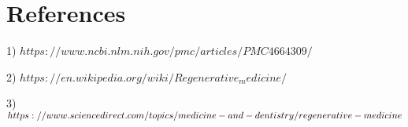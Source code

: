 \documentclass[12pt]{article}
\begin{document}
\centering \section*{\Huge References }
\Large
\raggedright  
1) $ https://www.ncbi.nlm.nih.gov/pmc/articles/PMC4664309/ $

\vspace{5mm}

2) $ https://en.wikipedia.org/wiki/Regenerative_medicine/  $ 

\vspace{5mm}

3) $ https://www.sciencedirect.com/topics/medicine-and-dentistry/  
\vspace{3mm} regenerative-medicine $
\end{document}
